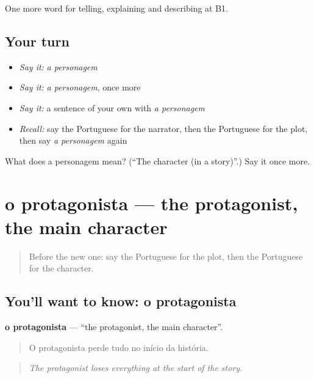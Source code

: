\begin{grammarlens}[title={What you've built}]
One more word for telling, explaining and describing at B1.
\end{grammarlens}

\subsection*{Your turn}
\begin{itemize}
\raggedright
  \item \emph{Say it:} \emph{a personagem}
  \item \emph{Say it:} \emph{a personagem}, once more
  \item \emph{Say it:} a sentence of your own with \emph{a personagem}
  \item \emph{Recall:} say the Portuguese for the narrator, then the Portuguese for the plot, then say \emph{a personagem} again
\end{itemize}

\begin{tcolorbox}[breakable,colback=teal!4,colframe=teal!35!black,title={Before you move on}]
What does a personagem mean? (\textquotedblleft{}The character (in a story)\textquotedblright{}.) Say it once more.
\end{tcolorbox}
\section[o protagonista]{o protagonista — the protagonist, the main character}

\label{lesson:PT-C325-protagonista}



\begin{quote}
Before the new one: say the Portuguese for the plot, then the Portuguese for the character.
\end{quote}

\subsection*{You'll want to know: o protagonista}
\textbf{o protagonista} — \textquotedblleft{}the protagonist, the main character\textquotedblright{}.

\begin{quote}
O protagonista perde tudo no início da história.
\end{quote}

\begin{quote}
\emph{The protagonist loses everything at the start of the story.}
\end{quote}

